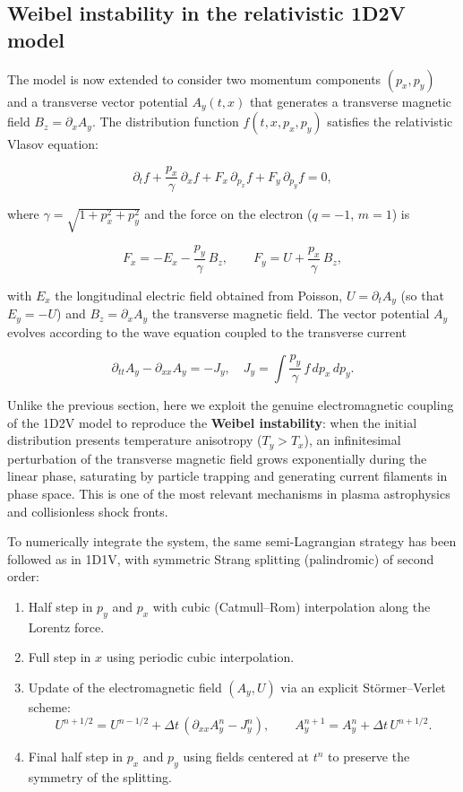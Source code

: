 \documentclass[11pt,a4paper,twoside,pdf]{article}
\numberwithin{equation}{section}
\begin{document}




\subsection{Weibel instability in the relativistic 1D2V model}
\label{sec:weibel}

The model is now extended to consider two momentum components
$(p_x,p_y)$ and a transverse vector potential $A_y(t,x)$ that generates a
transverse magnetic field $B_z = \partial_x A_y$. The distribution
function $f(t,x,p_x,p_y)$ satisfies the relativistic Vlasov equation:

\[
\partial_t f + \frac{p_x}{\gamma}\,\partial_x f
+ F_x\,\partial_{p_x} f + F_y\,\partial_{p_y} f = 0,
\]

where $\gamma = \sqrt{1 + p_x^2 + p_y^2}$ and the force on the electron
($q=-1$, $m=1$) is

\[
F_x = -E_x - \frac{p_y}{\gamma}\,B_z, \qquad
F_y = U + \frac{p_x}{\gamma}\,B_z,
\]

with $E_x$ the longitudinal electric field obtained from Poisson,
$U = \partial_t A_y$ (so that $E_y = -U$) and $B_z = \partial_x A_y$ the
transverse magnetic field. The vector potential $A_y$ evolves according to the
wave equation coupled to the transverse current

\[
\partial_{tt} A_y - \partial_{xx} A_y = - J_y,
\quad J_y = \int \frac{p_y}{\gamma}\, f\,dp_x\,dp_y.
\]

Unlike the previous section, here we exploit the genuine electromagnetic
coupling of the 1D2V model to reproduce the
\textbf{Weibel instability}: when the initial distribution presents
temperature anisotropy ($T_y > T_x$), an infinitesimal perturbation
of the transverse magnetic field grows exponentially during the linear
phase, saturating by particle trapping and generating current
filaments in phase space. This is one of the most
relevant mechanisms in plasma astrophysics and collisionless shock fronts.

To numerically integrate the system, the same
semi-Lagrangian strategy has been followed as in 1D1V, with symmetric Strang
splitting (palindromic) of second order:

\begin{enumerate}
    \item Half step in $p_y$ and $p_x$ with cubic (Catmull--Rom)
    interpolation along the Lorentz force.
    \item Full step in $x$ using periodic cubic interpolation.
    \item Update of the electromagnetic field $(A_y,U)$ via an
    explicit Störmer--Verlet scheme:
    \[
    U^{n+1/2} = U^{n-1/2} + \Delta t\,(\partial_{xx}A_y^n - J_y^n),\qquad
    A_y^{n+1} = A_y^n + \Delta t\, U^{n+1/2}.
    \]
    \item Final half step in $p_x$ and $p_y$ using fields centered at
    $t^n$ to preserve the symmetry of the splitting.
\end{enumerate}
\end{document}
